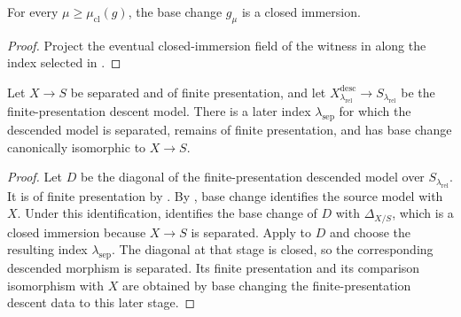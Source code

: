 \begin{lemma}
  \label{lemma:nagata-closed-immersion-descends}

  For every $\mu\geq\mu_{\mathrm{cl}}(g)$, the base change $g_\mu$ is a
  closed immersion.
\end{lemma}

\begin{proof}
  Project the eventual closed-immersion field of the witness in
   along the index selected in
  .
\end{proof}

\begin{lemma}
  \label{lemma:nagata-separated-descent-stage-exists}
  \leanok

  Let $X\to S$ be separated and of finite presentation, and let
  $X^{\mathrm{desc}}_{\lambda_{\mathrm{rel}}}\to
  S_{\lambda_{\mathrm{rel}}}$ be the finite-presentation descent model.
  There is a later index $\lambda_{\mathrm{sep}}$ for which the descended
  model is separated, remains of finite presentation, and has base change
  canonically isomorphic to $X\to S$.
\end{lemma}

\begin{proof}
  \leanok
  Let $D$ be the diagonal of the finite-presentation descended model over
  $S_{\lambda_{\mathrm{rel}}}$.  It is of finite presentation by
  .  By
  , base change identifies
  the source model with $X$.  Under this identification,
   identifies the base change of
  $D$ with $\Delta_{X/S}$, which is a closed immersion because $X\to S$ is
  separated.  Apply
   to $D$ and choose the
  resulting index $\lambda_{\mathrm{sep}}$.  The diagonal at that stage is
  closed, so the corresponding descended morphism is separated.  Its finite
  presentation and its comparison isomorphism with $X$ are obtained by base
  changing the finite-presentation descent data to this later stage.
\end{proof}

